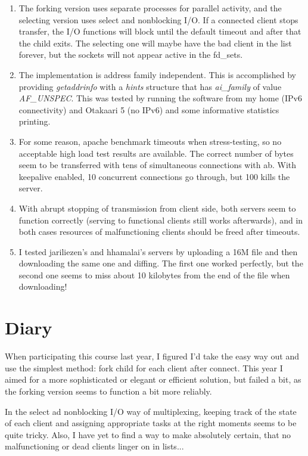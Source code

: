 \documentclass[a4paper,12pt]{article}
\begin{document}
\begin{enumerate}
\item The forking version uses separate processes for parallel activity, and the selecting version uses select and nonblocking I/O. If a connected client stops transfer, the I/O functions will block until the default timeout and after that the child exits. The selecting one will maybe have the bad client in the list forever, but the sockets will not appear active in the fd\_sets.
\item The implementation is address family independent. This is accomplished by providing \emph{getaddrinfo} with a \emph{hints} structure that has \emph{ai\_family} of value \emph{AF\_UNSPEC}. This was tested by running the software from my home (IPv6 connectivity) and Otakaari 5 (no IPv6) and some informative statistics printing.
\item For some reason, apache benchmark timeouts when stress-testing, so no acceptable high load test results are available. The correct number of bytes seem to be transferred with tens of simultaneous connections with ab. With keepalive enabled, 10 concurrent connections go through, but 100 kills the server.
\item With abrupt stopping of transmission from client side, both servers seem to function correctly (serving to functional clients still works afterwards), and in both cases resources of malfunctioning clients should be freed after timeouts.
\item I tested jariliezen's and hhamalai's servers by uploading a 16M file and then downloading the same one and diffing. The first one worked perfectly, but the second one seems to miss about 10 kilobytes from the end of the file when downloading!
\end{enumerate}

\section{Diary}
When participating this course last year, I figured I'd take the easy way out and use the simplest method: fork child for each client after connect. This year I aimed for a more sophisticated or elegant or efficient solution, but failed a bit, as the forking version seems to function a bit more reliably.

In the select ad nonblocking I/O way of multiplexing, keeping track of the state of each client and assigning appropriate tasks at the right moments seems to be quite tricky. Also, I have yet to find a way to make absolutely certain, that no malfunctioning or dead clients linger on in lists...
\end{document}
